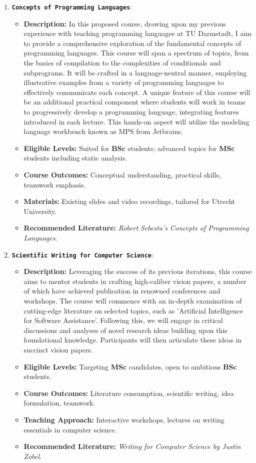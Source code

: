 \documentclass[10pt,a4paper,sans]{moderncv}
\begin{document}
\begin{enumerate}
    \item \textbf{\texttt{Concepts of Programming Languages}}:
    \begin{itemize}
        \item \textbf{Description:} In this proposed course, drawing upon my previous experience with teaching programming languages at TU Darmstadt, I aim to provide a comprehensive exploration of the fundamental concepts of programming languages. This course will span a spectrum of topics, from the basics of compilation to the complexities of conditionals and subprograms. It will be crafted in a language-neutral manner, employing illustrative examples from a variety of programming languages to effectively communicate each concept. A unique feature of this course will be an additional practical component where students will work in teams to progressively develop a programming language, integrating features introduced in each lecture. This hands-on aspect will utilize the modeling language workbench known as MPS from Jetbrains.
        \item \textbf{Eligible Levels:} Suited for \textbf{BSc} students; advanced topics for \textbf{MSc} students including static analysis.
        \item \textbf{Course Outcomes:} Conceptual understanding, practical skills, teamwork emphasis.
        \item \textbf{Materials:} Existing slides and video recordings, tailored for Utrecht University.
        \item \textbf{Recommended Literature:} \textit{Robert Sebesta's Concepts of Programming Languages}.
    \end{itemize}

    \item \textbf{\texttt{Scientific Writing for Computer Science}}:
    \begin{itemize}
        \item \textbf{Description:} Leveraging the success of its previous iterations, this course aims to mentor students in crafting high-caliber vision papers, a number of which have achieved publication in renowned conferences and workshops. The course will commence with an in-depth examination of cutting-edge literature on selected topics, such as 'Artificial Intelligence for Software Assistance'. Following this, we will engage in critical discussions and analyses of novel research ideas building upon this foundational knowledge. Participants will then articulate these ideas in succinct vision papers.
        \item \textbf{Eligible Levels:} Targeting \textbf{MSc} candidates, open to ambitious \textbf{BSc} students.
        \item \textbf{Course Outcomes:} Literature consumption, scientific writing, idea formulation, teamwork.
        \item \textbf{Teaching Approach:} Interactive workshops, lectures on writing essentials in computer science.
        \item \textbf{Recommended Literature:} \textit{Writing for Computer Science by Justin Zobel}.
    \end{itemize}


\end{enumerate}
\end{document}
